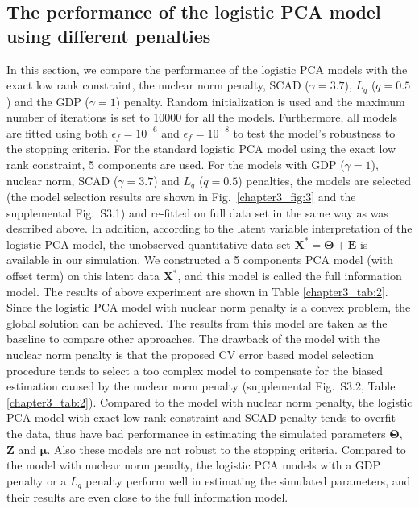\subsection{The performance of the logistic PCA model using different penalties}\label{chapter3_section_3_7}
In this section, we compare the performance of the logistic PCA models with the exact low rank constraint, the nuclear norm penalty, SCAD ($\gamma=3.7$), $L_{q}$ ($q=0.5$) and the GDP ($\gamma=1$) penalty. Random initialization is used and the maximum number of iterations is set to 10000 for all the models. Furthermore, all models are fitted using both $\epsilon_f = 10^{-6}$ and $\epsilon_f = 10^{-8}$ to test the model's robustness to the stopping criteria. For the standard logistic PCA model using the exact low rank constraint, 5 components are used. For the models with GDP ($\gamma=1$), nuclear norm, SCAD ($\gamma=3.7$) and $L_{q}$ ($q=0.5$) penalties, the models are selected (the model selection results are shown in Fig.~\ref{chapter3_fig:3} and the supplemental Fig.~S3.1) and re-fitted on full data set in the same way as was described above. In addition, according to the latent variable interpretation of the logistic PCA model, the unobserved quantitative data set $\mathbf{X}^{\ast} = \mathbf{\Theta} + \mathbf{E}$ is available in our simulation. We constructed a 5 components PCA model (with offset term) on this latent data $\mathbf{X}^{\ast}$, and this model is called the full information model. The results of above experiment are shown in Table \ref{chapter3_tab:2}. Since the logistic PCA model with nuclear norm penalty is a convex problem, the global solution can be achieved. The results from this model are taken as the baseline to compare other approaches. The drawback of the model with the nuclear norm penalty is that the proposed CV error based model selection procedure tends to select a too complex model to compensate for the biased estimation caused by the nuclear norm penalty (supplemental Fig.~S3.2, Table \ref{chapter3_tab:2}). Compared to the model with nuclear norm penalty, the logistic PCA model with exact low rank constraint and SCAD penalty tends to overfit the data, thus have bad performance in estimating the simulated parameters $\mathbf{\Theta}$, $\mathbf{Z}$ and $\bm{\mu}$. Also these models are not robust to the stopping criteria. Compared to the model with nuclear norm penalty, the logistic PCA models with a GDP penalty or a $L_{q}$ penalty perform well in estimating the simulated parameters, and their results are even close to the full information model.
